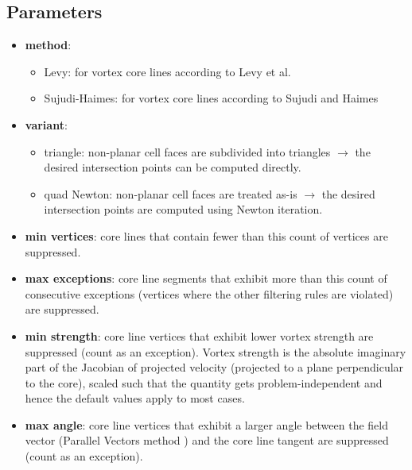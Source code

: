 \subsection{Parameters}
\begin{itemize}

\item
  \textbf{method}:
  \begin{itemize}
  \item
    Levy: for vortex core lines according to Levy et al. \cite{LevyDS90}
  \item
    Sujudi-Haimes: for vortex core lines according to Sujudi and Haimes \cite{SujudiH95}
  \end{itemize}

\item
  \textbf{variant}:
  \begin{itemize}
  \item
    triangle: non-planar cell faces are subdivided into triangles $\rightarrow$ the desired intersection points can be computed directly.
  \item
    quad Newton: non-planar cell faces are treated as-is $\rightarrow$ the desired intersection points are computed using Newton iteration.
  \end{itemize}

\item
  \textbf{min vertices}: core lines that contain fewer than this count of vertices are suppressed.

\item
  \textbf{max exceptions}: core line segments that exhibit more than this count of consecutive exceptions (vertices where the other filtering rules are violated) are suppressed.

\item
  \textbf{min strength}: core line vertices that exhibit lower vortex strength are suppressed (count as an exception). Vortex strength is the absolute imaginary part of the Jacobian of projected velocity (projected to a plane perpendicular to the core), scaled such that the quantity gets problem-independent and hence the default values apply to most cases.

\item
  \textbf{max angle}: core line vertices that exhibit a larger angle between the field vector (Parallel Vectors method \cite{PeikertR99}) and the core line tangent are suppressed (count as an exception).

\end{itemize}


